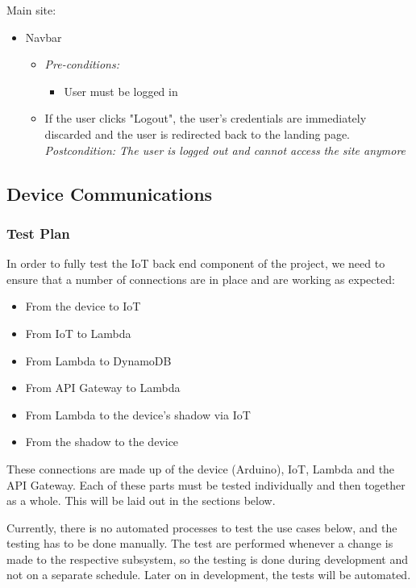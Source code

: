 \documentclass{article}
\begin{document}
				Main site:
				\begin{itemize}
					\item Navbar
					\begin{itemize}
						\item \textit{Pre-conditions:}
							\begin{itemize}
								\item User must be logged in
							\end{itemize}
						\item If the user clicks "Logout", the user's credentials are immediately discarded and the user is redirected back to the landing page. \textit{Postcondition: The user is logged out and cannot access the site anymore}
					\end{itemize}
				\end{itemize}
	
	\subsection{Device Communications}
	\subsubsection{Test Plan}
	In order to fully test the IoT back end component of the project, we need to ensure that a number of connections are in place and are working as expected:
	\begin{itemize}
		\item{From the device to IoT}
		\item{From IoT to Lambda}
		\item{From Lambda to DynamoDB}
		\\
		\item{From API Gateway to Lambda}
		\item{From Lambda to the device's shadow via IoT}
		\item{From the shadow to the device}
	\end{itemize}
	
	These connections are made up of the device (Arduino), IoT, Lambda and the API Gateway. Each of these parts must be tested individually and then together as a whole. This will be laid out in the sections below.
	
	Currently, there is no automated processes to test the use cases below, and the testing has to be done manually. The test are performed whenever a change is made to the respective subsystem, so the testing is done during development and not on a separate schedule. Later on in development, the tests will be automated.
\end{document}
